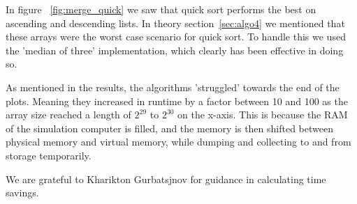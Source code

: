 \documentclass[sigconf, nonacm, natbib, screen, balance=False]{acmart}
\begin{document}
In figure ~\ref{fig:merge_quick} we saw that quick sort performs the best on ascending and descending lists. In theory section~\ref{sec:algo4} we mentioned that these arrays were the worst case scenario for quick sort. To handle this we used the 'median of three' implementation, which clearly has been effective in doing so. \newline

As mentioned in the results, the algorithms 'struggled' towards the end of the plots. Meaning they increased in runtime by a factor between 10 and 100 as the array size reached a length of $2^{29}$ to $2^{30}$ on the x-axis. This is because the RAM of the simulation computer is filled, and the memory is then shifted between physical memory and virtual memory, while dumping and collecting to and from storage temporarily. 

\begin{acks}
We are grateful to Kharikton Gurbatsjnov for guidance in calculating time savings.

\end{acks}




\begin{thebibliography}{References}



\end{thebibliography}






\end{document}

